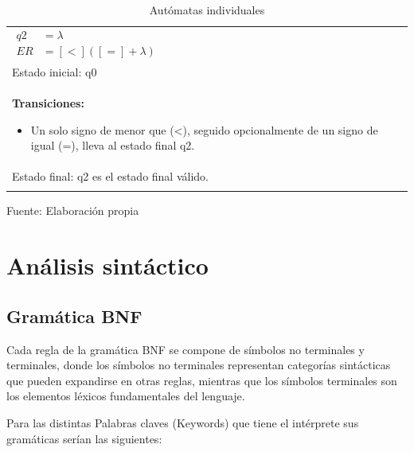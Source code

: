 \begin{center}
\begin{longtable}{|l|l|}
{\begin{minipage}{0.95\textwidth}
\begin{math}
\begin{array}{rl}
            q2 & = \lambda \\
            ER & = [<]([=] + \lambda)
          \end{array}
        \end{math}
      \end{minipage}
    } \\
    \multicolumn{2}{|l|}{Estado inicial: q0} \\
    \multicolumn{2}{|l|}{
      \begin{minipage}{0.9\textwidth
      }
        \textbf{Transiciones:}
        \vspace*{-1.5em}
        \begin{itemize}
          \item Un solo signo de menor que (<), seguido opcionalmente de un signo de igual (=), lleva al estado final q2.
        \end{itemize}
      \end{minipage}
    } \\
    \multicolumn{2}{|l|}{Estado final: q2 es el estado final válido.} \\
    \hline
    \caption{Autómatas individuales}
    \label{tab:automatas}
  \end{longtable}
  \vspace*{-4.5em}
  \centering Fuente: Elaboración propia
\end{center}

\section{Análisis sintáctico}
\subsection{Gramática BNF}
Cada regla de la gramática BNF se compone de símbolos no terminales y terminales, donde los símbolos no terminales representan categorías sintácticas que pueden expandirse en otras reglas, mientras que los símbolos terminales son los elementos léxicos fundamentales del lenguaje.

Para las distintas Palabras claves (Keywords) que tiene el intérprete sus gramáticas serían las siguientes:

